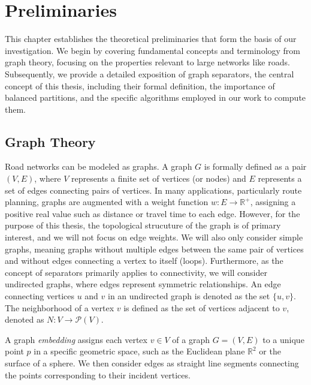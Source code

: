 \chapter{Preliminaries}
\label{ch:preliminaries}

This chapter establishes the theoretical preliminaries that form the basis of our investigation.
We begin by covering fundamental concepts and terminology from graph theory, focusing on the properties relevant to large networks like roads.
Subsequently, we provide a detailed exposition of graph separators, the central concept of this thesis, including their formal definition, the importance of balanced partitions, and the specific algorithms employed in our work to compute them.

\section{Graph Theory}
\label{sec:graphtheory}

Road networks can be modeled as graphs.
A graph \(G\) is formally defined as a pair \((V, E)\), where \(V\) represents a finite set of vertices (or nodes) and \(E\) represents a set of edges connecting pairs of vertices.
In many applications, particularly route planning, graphs are augmented with a weight function \(w: E \to \mathbb{R}^+\), assigning a positive real value such as distance or travel time to each edge.
However, for the purpose of this thesis, the topological strucuture of the graph is of primary interest, and we will not focus on edge weights.
We will also only consider simple graphs, meaning graphs without multiple edges between the same pair of vertices and without edges connecting a vertex to itself (loops).
Furthermore, as the concept of separators primarily applies to connectivity, we will consider undirected graphs, where edges represent symmetric relationships.
An edge connecting vertices \(u\) and \(v\) in an undirected graph is denoted as the set \(\{u,v\}\).
The neighborhood of a vertex \(v\) is defined as the set of vertices adjacent to \(v\), denoted as \(N : V \to \mathcal{P}(V)\).

A graph \emph{embedding} assigns each vertex \(v \in V\) of a graph \(G = (V, E)\) to a unique point \(p\) in a specific geometric space, such as the Euclidean plane \(\mathbb{R}^2\) or the surface of a sphere.
We then consider edges as straight line segments connecting the points corresponding to their incident vertices.

